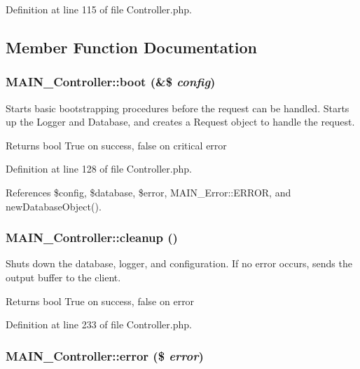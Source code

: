 Definition at line 115 of file Controller.php.

\subsection{Member Function Documentation}
\hypertarget{classMAIN__Controller_a5c77de67c4b47bcda0c997a5db3f32fa}{
\subsubsection[{boot}]{\setlength{\rightskip}{0pt plus 5cm}MAIN\_\-Controller::boot (\&\$ {\em config})}}
\label{d0/d6f/classMAIN__Controller_a5c77de67c4b47bcda0c997a5db3f32fa}
Starts basic bootstrapping procedures before the request can be handled. Starts up the Logger and Database, and creates a Request object to handle the request.

\begin{DoxyReturn}{Returns}
bool True on success, false on critical error 
\end{DoxyReturn}


Definition at line 128 of file Controller.php.

References \$config, \$database, \$error, MAIN\_\-Error::ERROR, and newDatabaseObject().\hypertarget{classMAIN__Controller_a6400bbd98dfe782c6c54b46e035a92c1}{
\subsubsection[{cleanup}]{\setlength{\rightskip}{0pt plus 5cm}MAIN\_\-Controller::cleanup ()}}
\label{d0/d6f/classMAIN__Controller_a6400bbd98dfe782c6c54b46e035a92c1}
Shuts down the database, logger, and configuration. If no error occurs, sends the output buffer to the client.

\begin{DoxyReturn}{Returns}
bool True on success, false on error 
\end{DoxyReturn}


Definition at line 233 of file Controller.php.\hypertarget{classMAIN__Controller_a252a95de7cc347b94614c5ae4fbf3d06}{
\subsubsection[{error}]{\setlength{\rightskip}{0pt plus 5cm}MAIN\_\-Controller::error (\$ {\em error})}}
\label{d0/d6f/classMAIN__Controller_a252a95de7cc347b94614c5ae4fbf3d06}


